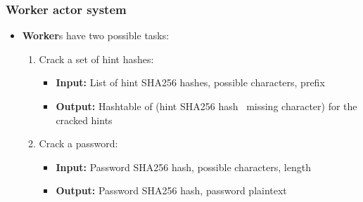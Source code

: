 \documentclass{beamer}
\begin{document}
\begin{frame}
	\frametitle{Worker actor system}

	\begin{figure}[!h]
		\centering
	\end{figure}

	\begin{itemize}

		\item \textbf{Worker}s have two possible tasks:

		\begin{enumerate}

			\item Crack a set of hint hashes:

			\begin{itemize}

				\item \textbf{Input:} List of hint SHA256 hashes, possible characters, prefix

				\item \textbf{Output:} Hashtable of (hint SHA256 hash \textrightarrow \ missing character) for the cracked hints

			\end{itemize}

			\item Crack a password:

			\begin{itemize}

				\item \textbf{Input:} Password SHA256 hash, possible characters, length

				\item \textbf{Output:} Password SHA256 hash, password plaintext

			\end{itemize}

		\end{enumerate}

	\end{itemize}
\end{frame}
\end{document}
